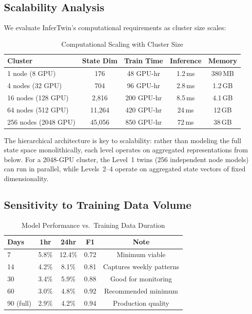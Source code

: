 \documentclass[conference,10pt]{IEEEtran}
\begin{document}
\subsection{Scalability Analysis}

We evaluate InferTwin's computational requirements as cluster size scales:

\begin{table}[!htbp]
\caption{Computational Scaling with Cluster Size}
\label{tab:scale}
\centering\scriptsize
\begin{tabular}{@{}lcccc@{}}
\toprule
\textbf{Cluster} & \textbf{State Dim} & \textbf{Train Time} & \textbf{Inference} & \textbf{Memory} \\
\midrule
1 node (8 GPU) & 176 & 48 GPU-hr & 1.2\,ms & 380\,MB \\
4 nodes (32 GPU) & 704 & 96 GPU-hr & 2.8\,ms & 1.2\,GB \\
16 nodes (128 GPU) & 2,816 & 200 GPU-hr & 8.5\,ms & 4.1\,GB \\
64 nodes (512 GPU) & 11,264 & 420 GPU-hr & 24\,ms & 12\,GB \\
256 nodes (2048 GPU) & 45,056 & 850 GPU-hr & 72\,ms & 38\,GB \\
\bottomrule
\end{tabular}
\end{table}

The hierarchical architecture is key to scalability: rather than modeling the full state space monolithically, each level operates on aggregated representations from below. For a 2048-GPU cluster, the Level~1 twins (256 independent node models) can run in parallel, while Levels~2--4 operate on aggregated state vectors of fixed dimensionality.

\subsection{Sensitivity to Training Data Volume}

\begin{table}[!htbp]
\caption{Model Performance vs.\ Training Data Duration}
\label{tab:datavol}
\centering\scriptsize
\begin{tabular}{@{}lcccc@{}}
\toprule
\textbf{Days} & \textbf{1hr} & \textbf{24hr} & \textbf{F1} & \textbf{Note} \\
\midrule
7 & 5.8\% & 12.4\% & 0.72 & Minimum viable \\
14 & 4.2\% & 8.1\% & 0.81 & Captures weekly patterns \\
30 & 3.4\% & 5.9\% & 0.88 & Good for monitoring \\
60 & 3.0\% & 4.8\% & 0.92 & Recommended minimum \\
90 (full) & 2.9\% & 4.2\% & 0.94 & Production quality \\
\bottomrule
\end{tabular}
\end{table}
\end{document}
